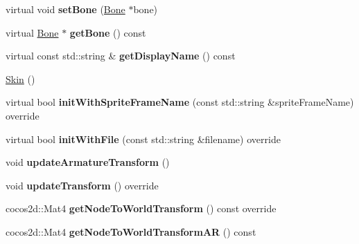 \begin{DoxyCompactItemize}
\item 
\mbox{\label{classcocostudio_1_1Skin_adae5d4c3c18f122bf43d8957646a7d4a}} 
virtual void {\bfseries set\+Bone} (\hyperlink{classcocostudio_1_1Bone}{Bone} $\ast$bone)
\item 
\mbox{\label{classcocostudio_1_1Skin_a39f172d3c7ef63eaf7fcfe5867c3c278}} 
virtual \hyperlink{classcocostudio_1_1Bone}{Bone} $\ast$ {\bfseries get\+Bone} () const
\item 
\mbox{\label{classcocostudio_1_1Skin_a24ed00df145371f6cf265b69891b44f6}} 
virtual const std\+::string \& {\bfseries get\+Display\+Name} () const
\item 
\hyperlink{classcocostudio_1_1Skin_a1df1a70d607e83c3494408ae4a2b0698}{Skin} ()
\item 
\mbox{\label{classcocostudio_1_1Skin_a8388ed5f42f80cfcbf6fbb48116fdb37}} 
virtual bool {\bfseries init\+With\+Sprite\+Frame\+Name} (const std\+::string \&sprite\+Frame\+Name) override
\item 
\mbox{\label{classcocostudio_1_1Skin_a00699f1b78722c5f8a719c87f6e4c706}} 
virtual bool {\bfseries init\+With\+File} (const std\+::string \&filename) override
\item 
\mbox{\label{classcocostudio_1_1Skin_aa46d0e73147e6158153aa2a705ec869b}} 
void {\bfseries update\+Armature\+Transform} ()
\item 
\mbox{\label{classcocostudio_1_1Skin_a1fd4c292f0146e470e59c84a03c035c0}} 
void {\bfseries update\+Transform} () override
\item 
\mbox{\label{classcocostudio_1_1Skin_a255a8c7f0da0c9c29999628fafba5f15}} 
cocos2d\+::\+Mat4 {\bfseries get\+Node\+To\+World\+Transform} () const override
\item 
\mbox{\label{classcocostudio_1_1Skin_a2fc5392fc2998eaa12c6d36b04ed603e}} 
cocos2d\+::\+Mat4 {\bfseries get\+Node\+To\+World\+Transform\+AR} () const
\item 
\mbox{\label{classcocostudio_1_1Skin_ae98cafc152e0c2c6007b2a873f9bb4de}} 

\end{DoxyCompactItemize}
